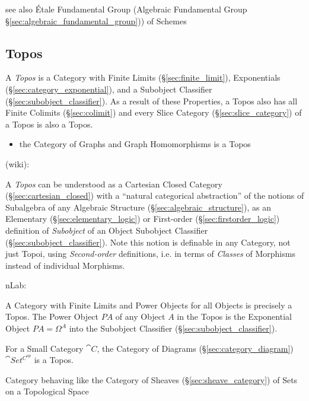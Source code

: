 see also \'Etale Fundamental Group (Algebraic Fundamental Group
\S\ref{sec:algebraic_fundamental_group})) of Schemes



\subsection{Topos}\label{sec:topos}

A \emph{Topos} is a Category with Finite Limits
(\S\ref{sec:finite_limit}), Exponentials
(\S\ref{sec:category_exponential}), and a Subobject Classifier
(\S\ref{sec:subobject_classifier}). As a result of these Properties, a
Topos also has all Finite Colimits (\S\ref{sec:colimit}) and every
Slice Category (\S\ref{sec:slice_category}) of a Topos is also a
Topos.

\begin{itemize}
  \item the Category of Graphs and Graph Homomorphisms is a Topos
\end{itemize}

(wiki):

A \emph{Topos} can be understood as a Cartesian Closed Category
(\S\ref{sec:cartesian_closed}) with a ``natural categorical abstraction'' of
the notions of Subalgebra of any Algebraic Structure
(\S\ref{sec:algebraic_structure}), as an Elementary
(\S\ref{sec:elementary_logic}) or First-order (\S\ref{sec:firstorder_logic})
definition of \emph{Subobject} of an Object \fist Subobject Classifier
(\S\ref{sec:subobject_classifier}).
Note this notion is definable in any Category, not just Topoi, using
\emph{Second-order} definitions, i.e. in terms of \emph{Classes} of Morphisms
instead of individual Morphisms.


nLab:

A Category with Finite Limits and Power Objects for all Objects is
precisely a Topos. The Power Object $P A$ of any Object $A$ in the
Topos is the Exponential Object $P A = \Omega^A$ into the Subobject
Classifier (\S\ref{sec:subobject_classifier}).

For a Small Category $\cat{C}$, the Category of Diagrams
(\S\ref{sec:category_diagram}) $\cat{Set^{C^{op}}}$ is a
Topos.\cite{awodey06}

Category behaving like the Category of Sheaves
(\S\ref{sec:sheave_category}) of Sets on a Topological Space

